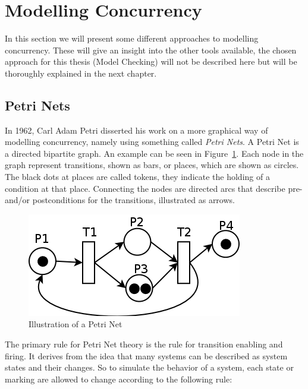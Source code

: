 \section{Modelling Concurrency}

In this section we will present some different approaches to modelling concurrency. These will give an insight into the other tools available, the chosen approach for this thesis (Model Checking) will not be described here but will be thoroughly explained in the next chapter.

\subsection{Petri Nets}

In 1962, Carl Adam Petri disserted his work on a more graphical way of modelling concurrency, namely using something called \textit{Petri Nets}. A Petri Net is a directed bipartite graph. An example can be seen in Figure~\ref{fig:petri_net}. Each node in the graph represent transitions, shown as bars, or places, which are shown as circles. The black dots at places are called tokens, they indicate the holding of a condition at that place. Connecting the nodes are directed arcs that describe pre- and/or postconditions for the transitions, illustrated as arrows. 

\begin{figure}[h]
    \includegraphics[scale=0.5]{include/figures/petri_net}
    \caption{Illustration of a Petri Net}
    \label{fig:petri_net}
\end{figure}

The primary rule for Petri Net theory is the rule for transition enabling and firing. It derives from the idea that many systems can be described as system states and their changes. So to simulate the behavior of a system, each state or marking are allowed to change according to the following rule:

